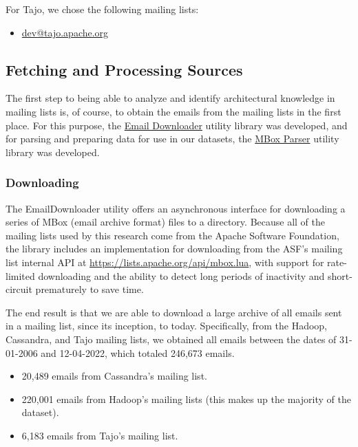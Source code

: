 \documentclass[a4paper, 12pt]{article}
\begin{document}
		For Tajo, we chose the following mailing lists:
		\begin{itemize}
			\item \href{https://lists.apache.org/list.html?dev@tajo.apache.org}{dev@tajo.apache.org}
		\end{itemize}
	
	\subsection{Fetching and Processing Sources}
		The first step to being able to analyze and identify architectural knowledge in mailing lists is, of course, to obtain the emails from the mailing lists in the first place. For this purpose, the \hyperref[sec:email-downloader]{Email Downloader} utility library was developed, and for parsing and preparing data for use in our datasets, the \hyperref[sec:mbox-parser]{MBox Parser} utility library was developed.
		
		\subsubsection{Downloading}
			The EmailDownloader utility offers an asynchronous interface for downloading a series of MBox (email archive format) files to a directory. Because all of the mailing lists used by this research come from the Apache Software Foundation, the library includes an implementation for downloading from the ASF's mailing list internal API at \href{https://lists.apache.org/api/mbox.lua}{https://lists.apache.org/api/mbox.lua}, with support for rate-limited downloading and the ability to detect long periods of inactivity and short-circuit prematurely to save time.
			
			The end result is that we are able to download a large archive of all emails sent in a mailing list, since its inception, to today. Specifically, from the Hadoop, Cassandra, and Tajo mailing lists, we obtained all emails between the dates of 31-01-2006 and 12-04-2022, which totaled 246,673 emails.
			
			\begin{itemize}
				\item 20,489 emails from Cassandra's mailing list.
				\item 220,001 emails from Hadoop's mailing lists (this makes up the majority of the dataset).
				\item 6,183 emails from Tajo's mailing list.
			\end{itemize}
			
\end{document}
